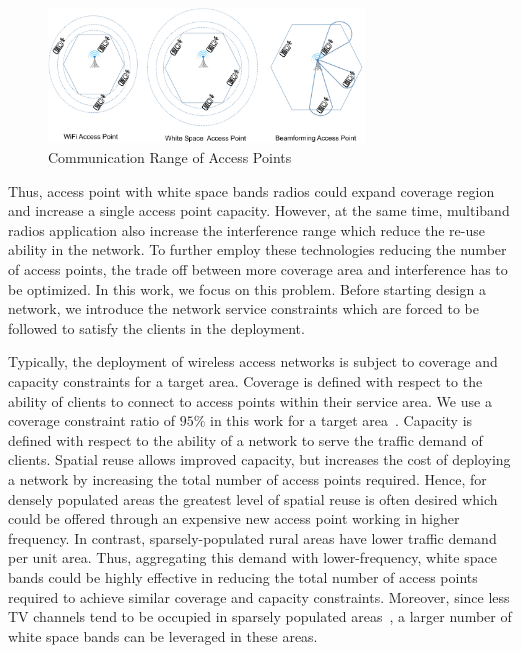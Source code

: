 \begin{figure}
\centering
\includegraphics[width=84mm]{figures/com_range}
\vspace{-0.1in}
\caption{Communication Range of Access Points}                                                                 
\label{fig:aprange}
\vspace{-0.1in}
\end{figure}

Thus, access point with white space bands radios
could expand coverage region and increase a single access point capacity. 
However, at the same time, multiband radios application also increase the interference
range which reduce the re-use ability in the network. 
To further employ these technologies reducing the number of access points, 
the trade off between more coverage area and interference 
has to be optimized. In this work, we focus on this problem.
Before starting design a network, we introduce 
the network service constraints which are forced to 
be followed to satisfy the clients in the deployment. 

Typically, the deployment of wireless access networks is subject to coverage and capacity
constraints for a target area. Coverage is defined with respect to the ability of
clients to connect to access points within their service area.  We use a coverage
constraint ratio of $95\%$ in this work for a target area~\cite{robinson2010deploying}.
Capacity is defined with respect to the ability of a network to serve the traffic 
demand of clients.  Spatial reuse allows improved capacity, but increases the cost
of deploying a network by increasing the total number of access points required.
Hence, for densely populated areas the greatest level of spatial reuse 
is often desired which could be offered through an expensive new access point working 
in higher frequency.
In contrast, sparsely-populated rural areas have lower traffic demand per unit area. Thus, 
aggregating this demand with lower-frequency, white space bands 
could be highly effective in reducing the total number of access points required to achieve 
similar coverage and capacity constraints. 
Moreover, since less TV channels tend to be occupied in sparsely 
populated areas~\cite{msdatabase}, a larger number 
 of white space bands can be leveraged in these areas. 

